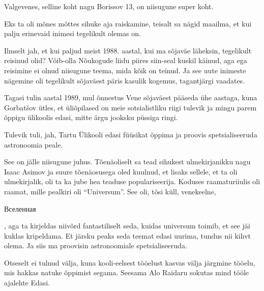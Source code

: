
Valgevenes, selline koht nagu Borissov 13,  on niisugune super koht. 

Eks ta oli mõnes mõttes sihuke aja raiskamine, teisalt sa nägid maailma, et kui 
palju erinevaid inimesi tegelikult olemas on.


Ilmselt jah, et kui paljud meist 1988. aastal, kui ma sõjaväe läheksin, 
tegelikult reisinud olid? Võib-olla Nõukogude liidu piires siin-seal kuskil 
käinud, aga ega reisimine ei olnud niisugune teema, mida kõik on teinud.  Ja 
see uute inimeste nägemine oli tegelikult sõjaväest päris kasulik kogemus, 
tagantjärgi vaadates.


Tagasi tulin aastal 1989, mul õnnestus Vene sõjaväest pääseda ühe aastaga, kuna 
Gorbatšov ütles, et üliõpilased on meie sotsialistliku riigi tulevik ja mingu 
parem õppigu ülikoolis  edasi, mitte ärgu jooksku püssiga ringi. 


Tulevik tuli, jah, Tartu Ülikooli edasi füüsikat õppima ja proovis 
spetsialiseeruda astronoomia peale.


See on jälle niisugune juhus. Tõenäoliselt sa tead sihukest ulmekirjanikku nagu 
Isaac Asimov ja suure tõenäosusega oled kuulnud, et lisaks sellele, et ta oli 
ulmekirjalik, oli ta ka jube hea teaduse populariseerija. Koduses 
raamaturiiulis oli raamat, mille pealkiri oli 
\enquote{Universum}. See oli, tõsi küll, venekeelne, \begin{russian}Вселенная\end{russian}, 
aga ta kirjeldas niivõrd fantastiliselt seda, kuidas universum toimib, et see 
jäi kuklas kripeldama. Et järsku peaks seda teemat edasi uurima,  tundus nii 
kihvt olema. Ja siis ma proovisin astronoomiale spetsialiseeruda.


Otseselt  ei tulnud välja, kuna kooli-eelsest tööelust kasvas välja järgmine 
tööelu, mis hakkas natuke õppimist segama. Seesama Alo 
Raidaru sokutas mind tööle ajalehte 
Edasi.

